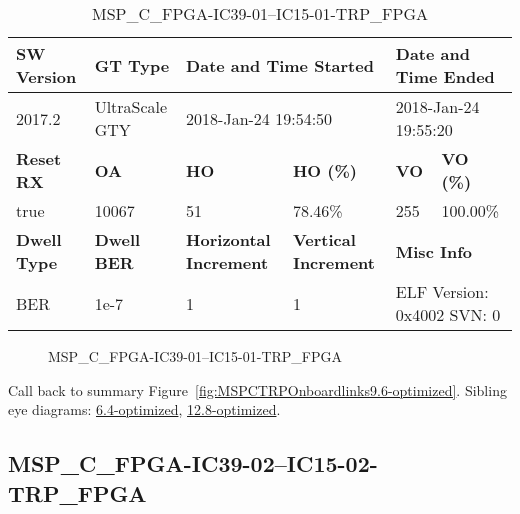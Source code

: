 \begin{table}[h]
\centering
\caption{MSP\_C\_FPGA-IC39-01--IC15-01-TRP\_FPGA}
\label{tab:MSPCFPGAIC3901IC1501TRPFPGA9.6-optimized}
\begin{tabular}{@{}|l|l|l|l|l|l|@{}}
\toprule
\textbf{SW Version}                & \textbf{GT Type}   & \multicolumn{2}{l|}{\textbf{Date and Time Started}}            & \multicolumn{2}{l|}{\textbf{Date and Time Ended}}        \\ \midrule
2017.2                       & UltraScale GTY          & \multicolumn{2}{l|}{2018-Jan-24 19:54:50}                   & \multicolumn{2}{l|}{2018-Jan-24 19:55:20}               \\ \midrule
\textbf{Reset RX}                  & \textbf{OA} & \textbf{HO}   & \textbf{HO (\%)} & \textbf{VO} & \textbf{VO (\%)} \\ \midrule
true & 10067        & 51          & 78.46\%        & 255        & 100.00\%       \\ \midrule
\textbf{Dwell Type}                & \textbf{Dwell BER} & \textbf{Horizontal Increment} & \textbf{Vertical Increment}    & \multicolumn{2}{l|}{\textbf{Misc Info}}                  \\ \midrule
BER                            & 1e-7        & 1        & 1           & \multicolumn{2}{l|}{ELF Version: 0x4002 SVN: 0}                         \\ \bottomrule
\end{tabular}
\end{table}

\begin{figure}[h]
\caption{MSP\_C\_FPGA-IC39-01--IC15-01-TRP\_FPGA} \label{fig:MSPCFPGAIC3901IC1501TRPFPGA9.6-optimized}
\end{figure}

Call back to summary Figure~\ref{fig:MSPCTRPOnboardlinks9.6-optimized}.
Sibling eye diagrams: \hyperref[sec:MSPCFPGAIC3901IC1501TRPFPGA6.4-optimized]{6.4-optimized}, \hyperref[sec:MSPCFPGAIC3901IC1501TRPFPGA12.8-optimized]{12.8-optimized}.

\clearpage
\newpage


\subsection{MSP\_C\_FPGA-IC39-02--IC15-02-TRP\_FPGA}\label{sec:MSPCFPGAIC3902IC1502TRPFPGA9.6-optimized}

